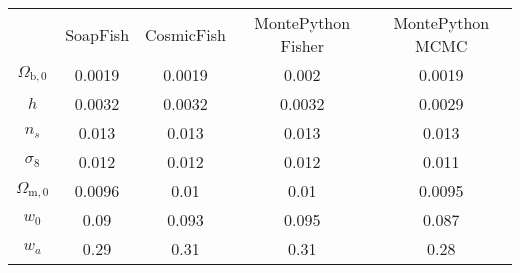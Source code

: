 \begin{table}
\centering
\begin{tabular}{|c|c|c|c|c|}
 & SoapFish & CosmicFish & MontePython Fisher & MontePython MCMC \\
$\Omega_{\mathrm{b},0}$ & 0.0019 & 0.0019 & 0.002 & 0.0019 \\
$h$ & 0.0032 & 0.0032 & 0.0032 & 0.0029 \\
$n_s$ & 0.013 & 0.013 & 0.013 & 0.013 \\
$\sigma_8$ & 0.012 & 0.012 & 0.012 & 0.011 \\
$\Omega_{\mathrm{m},0}$ & 0.0096 & 0.01 & 0.01 & 0.0095 \\
$w_0$ & 0.09 & 0.093 & 0.095 & 0.087 \\
$w_a$ & 0.29 & 0.31 & 0.31 & 0.28 \\
\end{tabular}
\end{table}
